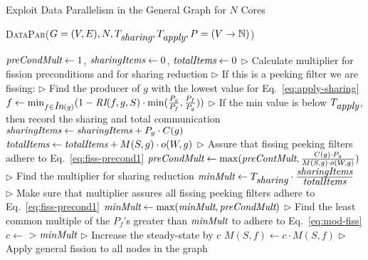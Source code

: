 \begin{algorithm}[th!]
\caption{Exploit Data Parallelism in the General Graph for $N$ Cores} \label {alg:data-parallelize}
\textsc{DataPar}($G=(V, E), N, T_{\mbox{\it sharing}},
T_{\mbox{\it apply}}, P=(V \rightarrow \mathbb{N}) $)
\begin{algorithmic}[1]
\State $\mbox{\it preCondMult} \gets 1$, $\mbox{\it sharingItems} \gets 0$, $\mbox{\it totalItems} \gets 0$
\State $\triangleright$ Calculate multiplier for fission preconditions and for sharing reduction
\State $\triangleright$ If this is a peeking filter we are fissing:
\State $\triangleright$ Find the producer of $g$ with the lowest
value for Eq.~\ref{eq:apply-sharing}
\State $f \gets \min_{f \in \mbox{\it In}(g)} (1 -\mbox{\it RI}(f,g, S) \cdot
\min(\frac{P_g}{P_f},\frac{P_f}{P_g} )) $
\label{ln:dp1}
\State $\triangleright$ If the min value is below $T_{\mbox{\it apply}}$,
then record the sharing and total communication
\State $\mbox{\it sharingItems} \gets \mbox{\it sharingItems} + P_g \cdot C(g)$
\State $\mbox{\it totalItems} \gets \mbox{\it totalItems} + M(S,g) \cdot o(W, g)$
\EndIf 
\State $\triangleright$ Assure that fissing peeking filters adhere to Eq.~\ref{eq:fiss-precond1}
\State $\mbox{\it preCondMult} \gets \max(\mbox{\it preContMult}, \frac{C(g) \cdot P_g}{M(S,g)
 \cdot o(W,g)})$  
\label{ln:dp3}
\EndIf
\EndFor
\State $\triangleright$ Find the multiplier for sharing reduction
\State $\mbox{\it minMult} \gets T_{\mbox{\it sharing}} \cdot \frac{\mbox{\it sharingItems}
}{\mbox{\it totalItems}}$
\label{ln:dp2}
\State $\triangleright$ Make sure that multiplier assures all fissing peeking filters
adhere to  Eq.~\ref{eq:fiss-precond1}
\State $\mbox{\it minMult} \gets \max(\mbox{\it minMult}, \mbox{\it preCondMult})$
\State $\triangleright$ Find the least common multiple of the $P_f$'s
greater than $\mbox{\it minMult}$ to adhere to Eq.~\ref{eq:mod-fiss}
\State $c \gets $ $ >
\mbox{\it minMult}$
\label{ln:dp4}
\State $\triangleright$ Increase the steady-state by $c$
\State $M(S,f) \gets c \cdot M(S, f)$
\EndFor
\State $\triangleright$ Apply general fission to all nodes in the graph
\State {}
\EndFor
\end{algorithmic}
\end{algorithm}


